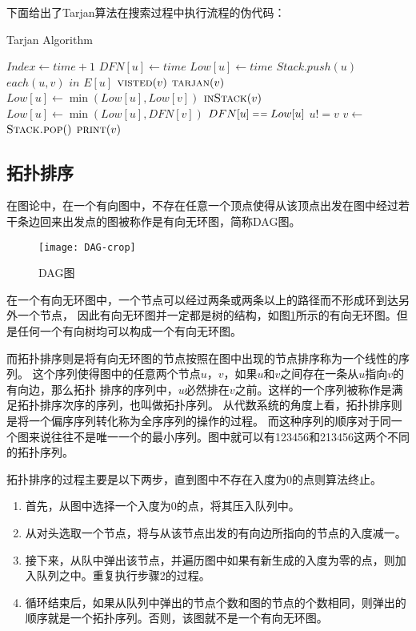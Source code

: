 下面给出了Tarjan算法在搜索过程中执行流程的伪代码：
\begin{algorithm} 
\caption {Tarjan Algorithm} 
\begin{codebox}
\li	$Index \leftarrow time + 1$
\li	$DFN[u] \leftarrow time$
\li	$Low[u] \leftarrow time$
\li	$Stack.push(u)$
\li	\For $each (u, v)$ $in$ $E[u]$
\li		\Do  \If $\textnormal{\scshape visted}(v)$
\li			\Then
				$\textnormal{\scshape tarjan}(v)$                  
\li            			$Low[u] \leftarrow \min(Low[u], Low[v])$
\li        		 \ElseIf $\textnormal{\scshape inStack}(v)$ 
\li            			\Then $Low[u] \leftarrow \min(Low[u], DFN[v])$
			\End
		\End
\li	\If $DFN[u] \isequal Low[u]$
\li		\Then \While $u != v$
\li				\Do $v \leftarrow$ $\textnormal{\scshape Stack.pop}()$                  
\li            				$\textnormal{\scshape print}(v)$
				\End 
		\End
\end{codebox}
\end{algorithm} 

\subsection{拓扑排序}
在图论中，在一个有向图中，不存在任意一个顶点使得从该顶点出发在图中经过若干条边回来出发点的图被称作是有向无环图，简称DAG图。
\begin{figure}[htbp]
\centering\texttt{[image: DAG-crop]}
\caption{DAG图}\label{fig:DAG}
\end{figure}
在一个有向无环图中，一个节点可以经过两条或两条以上的路径而不形成环到达另外一个节点，
因此有向无环图并一定都是树的结构，如图\ref{fig:DAG}所示的有向无环图。但是任何一个有向树均可以构成一个有向无环图。

而拓扑排序则是将有向无环图的节点按照在图中出现的节点排序称为一个线性的序列。
这个序列使得图中的任意两个节点$u$，$v$，如果$u$和$v$之间存在一条从$u$指向$v$的有向边，那么拓扑
排序的序列中，$u$必然排在$v$之前。这样的一个序列被称作是满足拓扑排序次序的序列，也叫做拓扑序列。
从代数系统的角度上看，拓扑排序则是将一个偏序序列转化称为全序序列的操作的过程。
而这种序列的顺序对于同一个图来说往往不是唯一一个的最小序列。图中就可以有123456和213456这两个不同的拓扑序列。

拓扑排序的过程主要是以下两步，直到图中不存在入度为0的点则算法终止。
\begin{enumerate}
\item 首先，从图中选择一个入度为0的点，将其压入队列中。
\item 从对头选取一个节点，将与从该节点出发的有向边所指向的节点的入度减一。
\item 接下来，从队中弹出该节点，并遍历图中如果有新生成的入度为零的点，则加入队列之中。重复执行步骤2的过程。
\item 循环结束后，如果从队列中弹出的节点个数和图的节点的个数相同，则弹出的顺序就是一个拓扑序列。否则，该图就不是一个有向无环图。
\end{enumerate}

